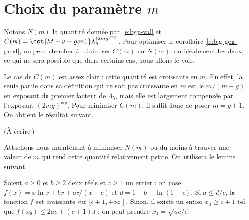 
\section{Choix du paramètre \( m \)}
\label{sec:opti-m}

Notons \( N(m) \) la quantité donnée par~\eqref{e:bgp-val} et \( C(m) =
  \cst{ht-v-gen1} \Lambda_5^{(2mg)^{mg}} \). Pour optimiser le
corollaire~\ref{c:big-gen-prod}, on peut chercher à minimiser \( C(m) \) ou \(
  N(m) \), ou idéalement les deux, ce qui ne sera possible que dans certains
cas, nous allons le voir.

Le cas de \( C(m) \) est assez clair : cette quantité est croissante en \( m
\). En effet, la seule partie dans sa définition qui ne soit pas croissante en
\( m \) est le \( m / (m-g) \) en exposant du premier facteur de \( \Lambda_5
\), mais elle est largement compensée par l'exposant \( (2mg)^{mg} \). Pour
minimiser \( C(m) \), il suffit donc de poser \( m = g+1 \). On obtient le
résultat suivant.

\begin{coro} \label{c:big-dec}
  \todo (À écrire.)
\end{coro}

Attachons-nous maintenant à minimiser \( N(m) \) ou du moins à trouver une
valeur de \( m \) qui rend cette quantité relativement petite. On utilisera
le lemme suivant.

\begin{lem} \label{l:minifun}
  Soient \( a \ge 0 \) et \( b \ge 2 \) deux réels et \( c \ge 1 \) un entier
  ; on pose \( f(x) = x \ln x + bx + ac / (x-c) \) et \( d = 1 + b + \ln(1+c)
  \). Si \( a \le d/c \), la fonction \( f \) est croissante sur \( [c+1,
    +\infty \mathclose[ \).  Sinon, il existe un entier \( x_0 \ge c + 1 \)
  tel que \( f(x_0) \le 2 ac + (c+1) d \) ; on peut prendre
  \( x_0 = \sqrt{ac/d} \).
\end{lem}

